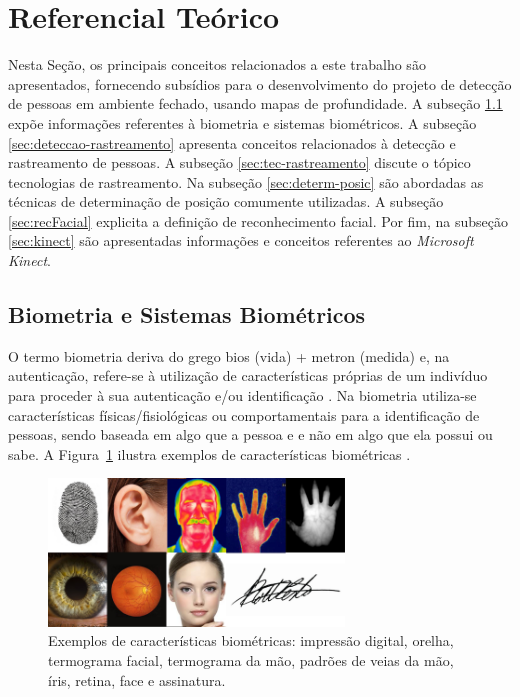 \section{Referencial Teórico}\label{sec:referencial-teorico}

Nesta Seção, os principais conceitos relacionados a este trabalho são apresentados, fornecendo subsídios para o desenvolvimento do projeto de detecção de pessoas em ambiente fechado, usando mapas de profundidade. A subseção \ref{sec:biometria} expõe informações referentes à biometria e sistemas biométricos. A subseção \ref{sec:deteccao-rastreamento} apresenta conceitos relacionados à detecção e rastreamento de pessoas. A subseção \ref{sec:tec-rastreamento} discute o tópico tecnologias de rastreamento. Na subseção \ref{sec:determ-posic} são abordadas as técnicas de determinação de posição comumente utilizadas. A subseção \ref{sec:recFacial} explicita a definição de reconhecimento facial. Por fim, na subseção \ref{sec:kinect} são apresentadas informações e conceitos referentes ao \textit{Microsoft Kinect}.

\subsection{Biometria e Sistemas Biométricos}\label{sec:biometria}
O termo biometria deriva do grego bios (vida) + metron (medida) e, na autenticação, refere-se à utilização de características próprias de um indivíduo para proceder à sua autenticação e/ou identificação \cite{magalhaes2003biometria}. Na biometria utiliza-se características físicas/fisiológicas ou comportamentais para a identificação de pessoas, sendo baseada em algo que a pessoa e e não em algo que ela possui ou sabe. A Figura~\ref{fig:biometria} ilustra exemplos de características biométricas \cite{cardia2015avaliaccao}.

\begin{figure}[ht]
\centering
    \includegraphics[resolution=300,width=0.7\textwidth,natwidth=610,natheight=642]{images/biometria.png}
    \caption{Exemplos de características biométricas: impressão digital, orelha, termograma facial, termograma da mão, padrões de veias da mão, íris, retina, face e assinatura.}
    \label{fig:biometria}
\end{figure}

